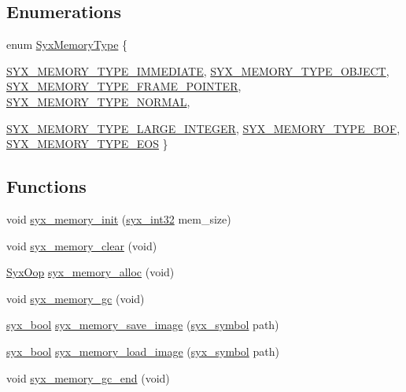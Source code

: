 \subsection*{Enumerations}
\begin{CompactItemize}
\item 
enum \hyperlink{syx-memory_8c_3c7c89c36d5970f74340ceffe8b58212}{SyxMemoryType} \{ \par
\hyperlink{syx-memory_8c_3c7c89c36d5970f74340ceffe8b582121da8e30583f5a53802d7750795593f0b}{SYX\_\-MEMORY\_\-TYPE\_\-IMMEDIATE}, 
\hyperlink{syx-memory_8c_3c7c89c36d5970f74340ceffe8b582120870010754185f10ef870463a888983a}{SYX\_\-MEMORY\_\-TYPE\_\-OBJECT}, 
\hyperlink{syx-memory_8c_3c7c89c36d5970f74340ceffe8b582123db01c9c9757cca8fd8c9039588f284c}{SYX\_\-MEMORY\_\-TYPE\_\-FRAME\_\-POINTER}, 
\hyperlink{syx-memory_8c_3c7c89c36d5970f74340ceffe8b58212b3562267ea94c7fe3d677bae4bfa6d24}{SYX\_\-MEMORY\_\-TYPE\_\-NORMAL}, 
\par
\hyperlink{syx-memory_8c_3c7c89c36d5970f74340ceffe8b58212513d41a66da4ce1bd602713020448d79}{SYX\_\-MEMORY\_\-TYPE\_\-LARGE\_\-INTEGER}, 
\hyperlink{syx-memory_8c_3c7c89c36d5970f74340ceffe8b582126981c2e1f08c487a2f9cf5df50019182}{SYX\_\-MEMORY\_\-TYPE\_\-BOF}, 
\hyperlink{syx-memory_8c_3c7c89c36d5970f74340ceffe8b5821298093ab7fdeac562eda67bcf508c8635}{SYX\_\-MEMORY\_\-TYPE\_\-EOS}
 \}
\end{CompactItemize}
\subsection*{Functions}
\begin{CompactItemize}
\item 
void \hyperlink{syx-memory_8c_f05eed3c8106e186265edf51194b912c}{syx\_\-memory\_\-init} (\hyperlink{syx-types_8h_9f31c17555a2dfcf25da84b5c4a2e55b}{syx\_\-int32} mem\_\-size)
\item 
void \hyperlink{syx-memory_8c_a035cb5cf9b570cb6584d6cd4aafe512}{syx\_\-memory\_\-clear} (void)
\item 
\hyperlink{syx-types_8h_1121caba2d40b2ce090b640762744ccd}{SyxOop} \hyperlink{syx-memory_8c_bcaea59428ce48c03c68b1058a089fb2}{syx\_\-memory\_\-alloc} (void)
\item 
void \hyperlink{syx-memory_8c_af66c4dd6200e6cc9bb87e7b28921599}{syx\_\-memory\_\-gc} (void)
\item 
\hyperlink{syx-types_8h_c6dc09b276b99fa1956364359139daab}{syx\_\-bool} \hyperlink{syx-memory_8c_693fc1a91ed11515e100275d7f99b413}{syx\_\-memory\_\-save\_\-image} (\hyperlink{syx-types_8h_9663af54b7b72f5d8be5f754ef356525}{syx\_\-symbol} path)
\item 
\hyperlink{syx-types_8h_c6dc09b276b99fa1956364359139daab}{syx\_\-bool} \hyperlink{syx-memory_8c_6a35f8cdd18f1615df7de7ac81911c95}{syx\_\-memory\_\-load\_\-image} (\hyperlink{syx-types_8h_9663af54b7b72f5d8be5f754ef356525}{syx\_\-symbol} path)
\item 
void \hyperlink{syx-memory_8c_31d33852bc51d3d58ea0bc9fbfd4d9e1}{syx\_\-memory\_\-gc\_\-end} (void)
\end{CompactItemize}
